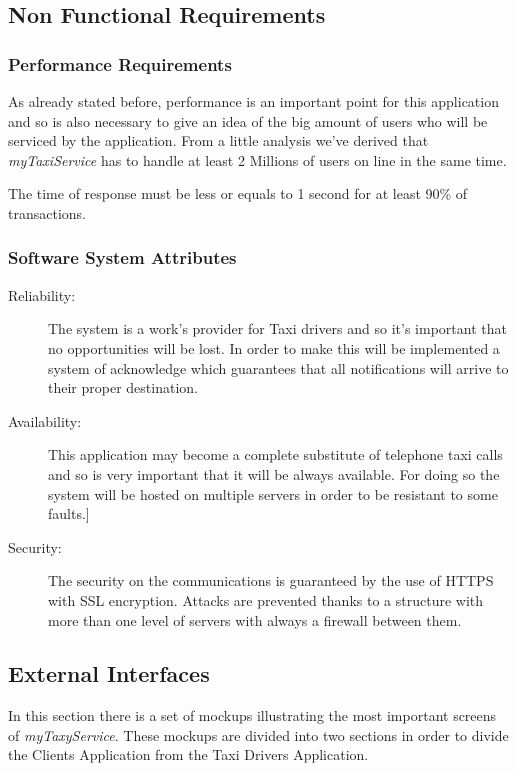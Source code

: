 \documentclass[a4paper]{article}
\begin{document}
\begin{enumerate}[label=\bfseries G\arabic*:]
\subsection{Non Functional Requirements}

\subsubsection{Performance Requirements}

As already stated before, performance is  an important point for this application and so is also necessary to give an idea of the big amount of users who will be serviced by the application.
From a little analysis we've derived that \emph{myTaxiService} has to handle at least 2 Millions of users on line in the same time.

The time of response must be less or equals to 1 second for at least 90\% of transactions.

\subsubsection{Software System Attributes}
\begin{description}
\item[Reliability:] The system is a work's provider for Taxi drivers and so it's important that no opportunities will be lost. \newline In order to make this will be implemented a system of acknowledge which guarantees that all notifications will arrive to their proper destination.

\item[Availability:] This application may become a complete substitute of telephone taxi calls and so is very important that it will be always available. For doing so the system will be hosted on multiple servers in order to be resistant to some faults.]
\item[Security:] The security on the communications is guaranteed by the use of HTTPS with SSL encryption. \newline Attacks are prevented thanks to a structure with more than one level of servers with always a firewall between them.
\end{description}

\subsection{External Interfaces}

In this section there is a set of mockups illustrating the most important screens of \emph{myTaxyService}. These mockups are divided into two sections in order to divide the Clients Application from the Taxi Drivers Application.


\end{enumerate}
\end{document}
